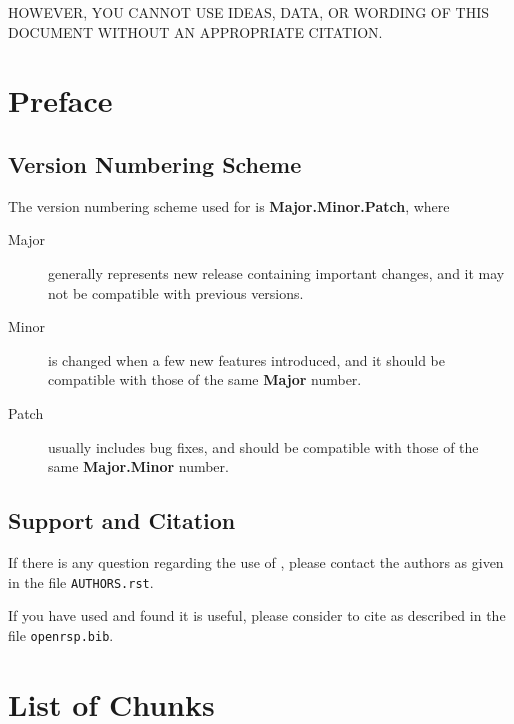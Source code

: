 \documentclass[a4paper,11pt,final]{article}
\begin{document}
HOWEVER, YOU CANNOT USE IDEAS, DATA, OR WORDING OF THIS DOCUMENT
WITHOUT AN APPROPRIATE CITATION.
\endgroup

\clearpage

\tableofcontents

\clearpage

\pagestyle{noweb}

\section{Preface}

\subsection{Version Numbering Scheme}

The version numbering scheme used for \LibName is \textbf{Major.Minor.Patch},
where
\begin{description}
  \item[Major] generally represents new release containing important changes,
    and it may not be compatible with previous versions.
  \item[Minor] is changed when a few new features introduced, and it should be
    compatible with those of the same \textbf{Major} number.
  \item[Patch] usually includes bug fixes, and should be compatible with those
    of the same \textbf{Major.Minor} number.
\end{description}

\subsection{Support and Citation}

If there is any question regarding the use of \LibName, please contact
the authors as given in the file \texttt{AUTHORS.rst}.

If you have used \LibName and found it is useful, please consider to cite
\LibName as described in the file \texttt{openrsp.bib}.



\section{List of Chunks}

\nowebchunks




\printindex
\end{document}
